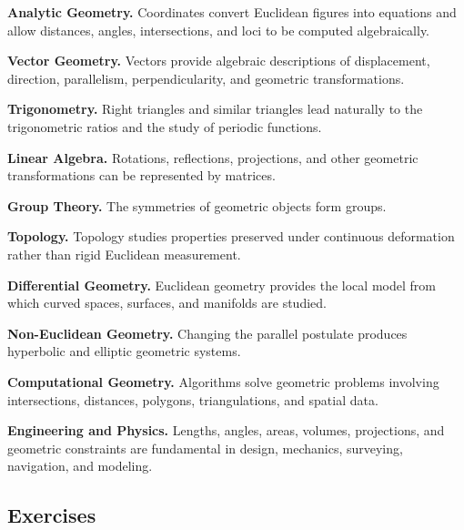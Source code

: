 \begin{applicationbox}
\textbf{Analytic Geometry.}
Coordinates convert Euclidean figures into equations and allow distances,
angles, intersections, and loci to be computed algebraically.

\medskip

\textbf{Vector Geometry.}
Vectors provide algebraic descriptions of displacement, direction,
parallelism, perpendicularity, and geometric transformations.

\medskip

\textbf{Trigonometry.}
Right triangles and similar triangles lead naturally to the trigonometric
ratios and the study of periodic functions.

\medskip

\textbf{Linear Algebra.}
Rotations, reflections, projections, and other geometric transformations can
be represented by matrices.

\medskip

\textbf{Group Theory.}
The symmetries of geometric objects form groups.

\medskip

\textbf{Topology.}
Topology studies properties preserved under continuous deformation rather
than rigid Euclidean measurement.

\medskip

\textbf{Differential Geometry.}
Euclidean geometry provides the local model from which curved spaces,
surfaces, and manifolds are studied.

\medskip

\textbf{Non-Euclidean Geometry.}
Changing the parallel postulate produces hyperbolic and elliptic geometric
systems.

\medskip

\textbf{Computational Geometry.}
Algorithms solve geometric problems involving intersections, distances,
polygons, triangulations, and spatial data.

\medskip

\textbf{Engineering and Physics.}
Lengths, angles, areas, volumes, projections, and geometric constraints are
fundamental in design, mechanics, surveying, navigation, and modeling.
\end{applicationbox}

\subsection{Exercises}
\label{subsec:euclidean-geometry-exercises}

